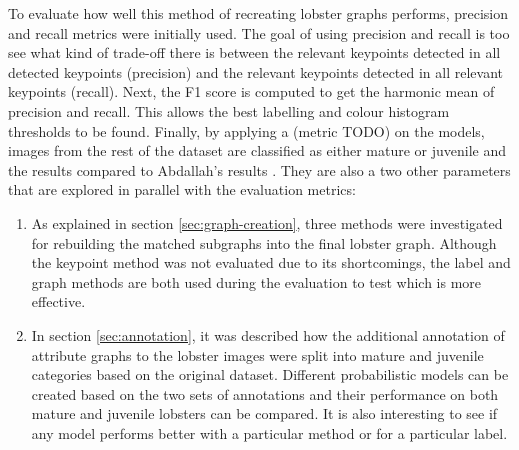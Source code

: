 To evaluate how well this method of recreating lobster graphs performs, precision and recall metrics were initially used. The goal of using precision and recall is too see what kind of trade-off there is between the relevant keypoints detected in all detected keypoints (precision) and the relevant keypoints detected in all relevant keypoints (recall). Next, the F1 score is computed to get the harmonic mean of precision and recall. This allows the best labelling and colour histogram thresholds to be found. Finally, by applying a (metric TODO) on the models, images from the rest of the dataset are classified as either mature or juvenile and the results compared to Abdallah's results \cite{lobster-thesis}.
\n
They are also a two other parameters that are explored in parallel with the evaluation metrics:
\begin{enumerate}
\item As explained in section \ref{sec:graph-creation}, three methods were investigated for rebuilding the matched subgraphs into the final lobster graph. Although the keypoint method was not evaluated due to its shortcomings, the label and graph methods are both used during the evaluation to test which is more effective.
\item In section \ref{sec:annotation}, it was described how the additional annotation of attribute graphs to the lobster images were split into mature and juvenile categories based on the original dataset. Different probabilistic models can be created based on the two sets of annotations and their performance on both mature and juvenile lobsters can be compared. It is also interesting to see if any model performs better with a particular method or for a particular label. 
\end{enumerate}

